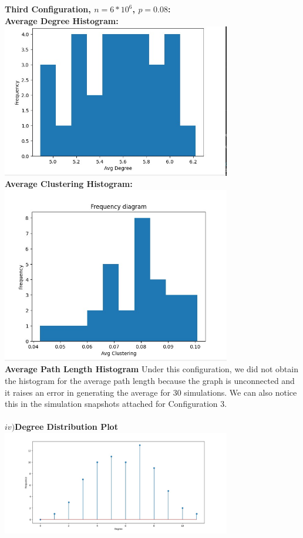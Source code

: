 \documentclass[answers]{exam}
\begin{document}
\begin{questions}
\begin{framed}
\textbf{Third Configuration, $n=6*10^6$, $p=0.08$:}\\\textbf{Average Degree Histogram:} \\ \includegraphics[width=10cm]{avg degree 3.jpg}\\\textbf{Average Clustering Histogram:}\\\includegraphics[width=10cm]{g3-cc.jpg}\\\textbf{Average Path Length Histogram} Under this configuration, we did not obtain the histogram for the average path length because the graph is unconnected and it raises an error in generating the average for 30 simulations. We can also notice this in the simulation snapshots attached for Configuration 3. \\\\\textbf{$iv) $Degree Distribution Plot} \\\includegraphics[width=10cm]{deg dist 3.jpg}

\end{framed}
\end{questions}
\end{document}
